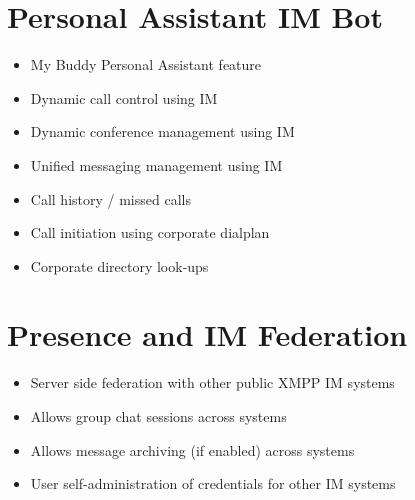\documentclass[letterpaper,10pt,english]{sphinxmanual}
\begin{document}
\section{Personal Assistant IM Bot}
\label{\detokenize{features:personal-assistant-im-bot}}\begin{itemize}
\item {} 
My Buddy Personal Assistant feature

\item {} 
Dynamic call control using IM

\item {} 
Dynamic conference management using IM

\item {} 
Unified messaging management using IM

\item {} 
Call history / missed calls

\item {} 
Call initiation using corporate dialplan

\item {} 
Corporate directory look-ups

\end{itemize}


\section{Presence and IM Federation}
\label{\detokenize{features:presence-and-im-federation}}\begin{itemize}
\item {} 
Server side federation with other public XMPP IM systems

\item {} 
Allows group chat sessions across systems

\item {} 
Allows message archiving (if enabled) across systems

\item {} 
User self-administration of credentials for other IM systems

\end{itemize}
\end{document}
